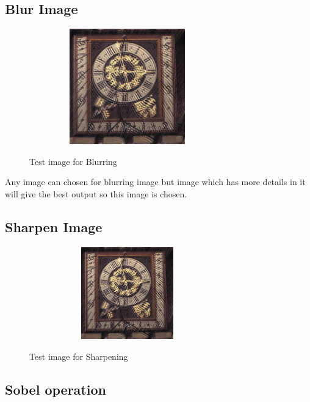 \documentclass{article}
\begin{document}
\subsection{Blur Image}
\begin{figure}[htb]

\begin{minipage}[b]{1.0\linewidth}
  \centering
  \centerline{\includegraphics[width=8.5cm,height=5cm,keepaspectratio]{temp.jpg}}
  \centerline{Test image for Blurring\cite{WEBSITE:14}}\medskip
\end{minipage}
%
\end{figure}
Any image can chosen for blurring image but image which has more details in it will give the best output so this image is chosen. 


\subsection{Sharpen Image}
\begin{figure}[htb]

\begin{minipage}[b]{1.0\linewidth}
  \centering
  \centerline{\includegraphics[width=8.5cm,height=4cm,keepaspectratio]{temp.jpg}}
  \centerline{Test image for Sharpening\cite{WEBSITE:17}}\medskip
\end{minipage}
%
\end{figure}

 
\subsection{Sobel operation}
\end{document}
